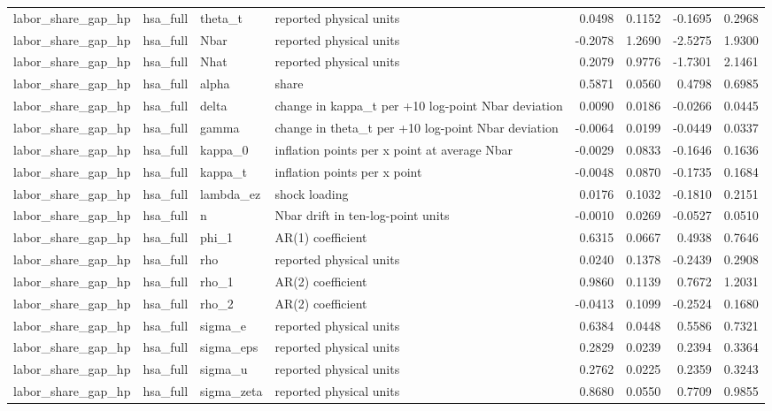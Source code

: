 \begin{tabular}{llllrrrr}
labor\_share\_gap\_hp & hsa\_full & theta\_t & reported physical units & 0.0498 & 0.1152 & -0.1695 & 0.2968 \\
labor\_share\_gap\_hp & hsa\_full & Nbar & reported physical units & -0.2078 & 1.2690 & -2.5275 & 1.9300 \\
labor\_share\_gap\_hp & hsa\_full & Nhat & reported physical units & 0.2079 & 0.9776 & -1.7301 & 2.1461 \\
labor\_share\_gap\_hp & hsa\_full & alpha & share & 0.5871 & 0.0560 & 0.4798 & 0.6985 \\
labor\_share\_gap\_hp & hsa\_full & delta & change in kappa\_t per +10 log-point Nbar deviation & 0.0090 & 0.0186 & -0.0266 & 0.0445 \\
labor\_share\_gap\_hp & hsa\_full & gamma & change in theta\_t per +10 log-point Nbar deviation & -0.0064 & 0.0199 & -0.0449 & 0.0337 \\
labor\_share\_gap\_hp & hsa\_full & kappa\_0 & inflation points per x point at average Nbar & -0.0029 & 0.0833 & -0.1646 & 0.1636 \\
labor\_share\_gap\_hp & hsa\_full & kappa\_t & inflation points per x point & -0.0048 & 0.0870 & -0.1735 & 0.1684 \\
labor\_share\_gap\_hp & hsa\_full & lambda\_ez & shock loading & 0.0176 & 0.1032 & -0.1810 & 0.2151 \\
labor\_share\_gap\_hp & hsa\_full & n & Nbar drift in ten-log-point units & -0.0010 & 0.0269 & -0.0527 & 0.0510 \\
labor\_share\_gap\_hp & hsa\_full & phi\_1 & AR(1) coefficient & 0.6315 & 0.0667 & 0.4938 & 0.7646 \\
labor\_share\_gap\_hp & hsa\_full & rho & reported physical units & 0.0240 & 0.1378 & -0.2439 & 0.2908 \\
labor\_share\_gap\_hp & hsa\_full & rho\_1 & AR(2) coefficient & 0.9860 & 0.1139 & 0.7672 & 1.2031 \\
labor\_share\_gap\_hp & hsa\_full & rho\_2 & AR(2) coefficient & -0.0413 & 0.1099 & -0.2524 & 0.1680 \\
labor\_share\_gap\_hp & hsa\_full & sigma\_e & reported physical units & 0.6384 & 0.0448 & 0.5586 & 0.7321 \\
labor\_share\_gap\_hp & hsa\_full & sigma\_eps & reported physical units & 0.2829 & 0.0239 & 0.2394 & 0.3364 \\
labor\_share\_gap\_hp & hsa\_full & sigma\_u & reported physical units & 0.2762 & 0.0225 & 0.2359 & 0.3243 \\
labor\_share\_gap\_hp & hsa\_full & sigma\_zeta & reported physical units & 0.8680 & 0.0550 & 0.7709 & 0.9855 \\

\end{tabular}
